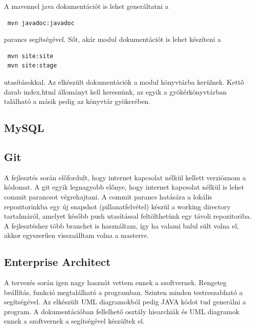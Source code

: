 A mavennel java dokumentációt is lehet generáltatni a
\begin{verbatim}
 mvn javadoc:javadoc
\end{verbatim}
 parancs segítségével. Sőt, akár modul dokumentációt is lehet készíteni a 
\begin{verbatim}
 mvn site:site
 mvn site:stage
\end{verbatim}
utasításokkal. Az elkészült dokumentációk a modul  könyvtárba kerülnek. Kettő darab index.html állományt kell keresnünk, az egyik a gyökérkönyvtárban található a másik pedig az  könyvtár gyökerében.
 
\subsection{MySQL}
\subsection{Git}
A fejlesztés során előfordult, hogy internet kapcsolat nélkül kellett verzióznom a kódomat. A git egyik legnagyobb előnye, hogy internet kapcsolat nélkül is lehet commit parancsot végrehajtani. A commit parancs hatására a lokális repozitorinkba egy új snapshot (pillanatfelvétel) készül a working directory tartalmáról, amelyet később push utasítással feltölthetünk egy távoli repozitoriba. A fejlesztéshez több branchet is használtam, így ha valami balul sült volna el, akkor egyszerűen visszaálltam volna a masterre.

\subsection{Enterprise Architect}
A tervezés során igen nagy hasznát vettem ennek a szoftvernek. Rengeteg beállítás, funkció megtalálható a programban. Szinten minden testreszabható a segítségével. Az elkészült UML diagramokból pedig JAVA kódot tud generálni a program. A dokumentációban fellelhető osztály hiearchiák és UML diagramok ennek a szoftvernek a segítségével készültek el.

